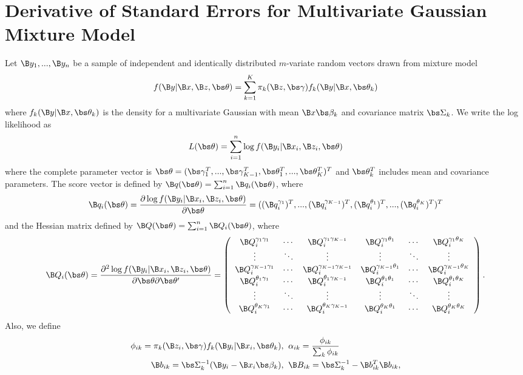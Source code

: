 \chapter{Derivative of Standard Errors for Multivariate Gaussian Mixture Model}

Let $\B y_{1},...,\B y_{n}$ be a sample of independent and identically distributed  $m$-variate random vectors drawn from mixture model
$$f(\B y|\B x, \B z, \bs\theta) = \sum^{K}_{k=1}\pi_{k}(\B z, \bs\gamma)f_{k}(\B y|\B x, \bs \theta_{k})$$
where $f_{k}(\B y|\B x, \bs \theta_{k})$ is the density for a multivariate Gaussian with mean $\B x\bs\beta_{k}$ and covariance matrix $\bs\Sigma_{k}$. We write the log likelihood as
$$L(\bs\theta)=\sum^{n}_{i=1}\log f(\B y_{i}|\B x_{i},\B z_{i},\bs\theta)$$
where the complete parameter vector is $\bs\theta=(\bs\gamma_{1}^{T},...,\bs\gamma_{K-1}^{T},\bs\theta^{T}_{1},...,\bs\theta^{T}_{K})^{T}$ and $\bs\theta_{k}^{T}$ includes mean and covariance parameters. The score vector is defined by $\B q(\bs\theta)=\sum_{i=1}^{n}\B q_{i}(\bs \theta)$, where
$$\B q_{i}(\bs\theta)=\frac{\partial \log f(\B y_{i}|\B x_{i},\B z_{i},\bs\theta)}{\partial \bs\theta}=((\B q^{\gamma_{1}}_{i})^{T},...,(\B q^{\gamma_{K-1}}_{i})^{T},(\B q^{\theta_{1}}_{i})^{T},...,(\B q^{\theta_{K}}_{i})^{T})^{T}$$
and the Hessian matrix defined by $\B Q(\bs\theta)=\sum_{i=1}^{n}\B Q_{i}(\bs\theta)$, where
$$ \B Q_{i}(\bs\theta)=\frac{\partial^{2} \log f(\B y_{i}|\B x_{i},\B z_{i},\bs\theta)}{\partial \bs\theta\partial \bs\theta'}=\left(\begin{array}{cccccc} \B Q^{\gamma_{1}\gamma_{1}}_{i}&\cdots&\B Q^{\gamma_{1}\gamma_{K-1}}_{i}&\B Q^{\gamma_{1}\theta_{1}}_{i}&\cdots&\B Q^{\gamma_{1}\theta_{K}}_{i}\\
\vdots&\ddots&\vdots&\vdots&\ddots&\vdots\\
\B Q^{\gamma_{K-1}\gamma_{1}}_{i}&\cdots&\B Q^{\gamma_{K-1}\gamma_{K-1}}_{i}&\B Q^{\gamma_{K-1}\theta_{1}}_{i}&\cdots&\B Q^{\gamma_{K-1}\theta_{K}}_{i}\\
\B Q^{\theta_{1}\gamma_{1}}_{i}&\cdots&\B Q^{\theta_{1}\gamma_{K-1}}_{i}&\B Q^{\theta_{1}\theta_{1}}_{i}&\cdots&\B Q^{\theta_{1}\theta_{K}}_{i}\\
\vdots&\ddots&\vdots&\vdots&\ddots&\vdots\\
\B Q^{\theta_{K}\gamma_{1}}_{i}&\cdots&\B Q^{\theta_{K}\gamma_{K-1}}_{i}&\B Q^{\theta_{K}\theta_{1}}_{i}&\cdots&\B Q^{\theta_{K}\theta_{K}}_{i}\\
\end{array} \right).$$
Also, we define
\begin{align}
\phi_{ik}=\pi_{k}(\B z_{i},\bs\gamma)f_{k}(\B y_{i}|\B x_{i},\bs\theta_{k}),&\;\; \alpha_{ik}=\frac{\phi_{ik}}{\sum_{k}\phi_{ik}}\label{phi}\\
\B b_{ik}=\bs\Sigma_{k}^{-1}(\B y_{i}-\B x_{i}\bs\beta_{k}),&\;\; \B B_{ik}=\bs\Sigma_{k}^{-1}-\B b^{T}_{ik}\B b_{ik},\label{bs2}
\end{align}

